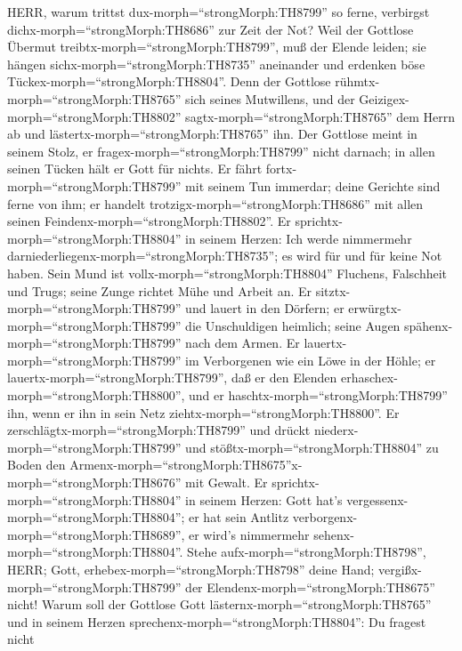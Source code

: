  HERR, warum trittst dux-morph=``strongMorph:TH8799'' so
ferne, verbirgst dichx-morph=``strongMorph:TH8686'' zur Zeit der Not?
 Weil der Gottlose Übermut
treibtx-morph=``strongMorph:TH8799'', muß der Elende leiden; sie hängen
sichx-morph=``strongMorph:TH8735'' aneinander und erdenken böse
Tückex-morph=``strongMorph:TH8804''.  Denn der Gottlose
rühmtx-morph=``strongMorph:TH8765'' sich seines Mutwillens, und der
Geizigex-morph=``strongMorph:TH8802'' sagtx-morph=``strongMorph:TH8765''
dem Herrn ab und lästertx-morph=``strongMorph:TH8765'' ihn. 
Der Gottlose meint in seinem Stolz, er
fragex-morph=``strongMorph:TH8799'' nicht darnach; in allen seinen
Tücken hält er Gott für nichts.  Er fährt
fortx-morph=``strongMorph:TH8799'' mit seinem Tun immerdar; deine
Gerichte sind ferne von ihm; er handelt
trotzigx-morph=``strongMorph:TH8686'' mit allen seinen
Feindenx-morph=``strongMorph:TH8802''.  Er
sprichtx-morph=``strongMorph:TH8804'' in seinem Herzen: Ich werde
nimmermehr darniederliegenx-morph=``strongMorph:TH8735''; es wird für
und für keine Not haben.  Sein Mund ist
vollx-morph=``strongMorph:TH8804'' Fluchens, Falschheit und Trugs; seine
Zunge richtet Mühe und Arbeit an.  Er
sitztx-morph=``strongMorph:TH8799'' und lauert in den Dörfern; er
erwürgtx-morph=``strongMorph:TH8799'' die Unschuldigen heimlich; seine
Augen spähenx-morph=``strongMorph:TH8799'' nach dem Armen. 
Er lauertx-morph=``strongMorph:TH8799'' im Verborgenen wie ein Löwe in
der Höhle; er lauertx-morph=``strongMorph:TH8799'', daß er den Elenden
erhaschex-morph=``strongMorph:TH8800'', und er
haschtx-morph=``strongMorph:TH8799'' ihn, wenn er ihn in sein Netz
ziehtx-morph=``strongMorph:TH8800''.  Er
zerschlägtx-morph=``strongMorph:TH8799'' und drückt
niederx-morph=``strongMorph:TH8799'' und
stößtx-morph=``strongMorph:TH8804'' zu Boden den
Armenx-morph=``strongMorph:TH8675''x-morph=``strongMorph:TH8676'' mit
Gewalt.  Er sprichtx-morph=``strongMorph:TH8804'' in seinem
Herzen: Gott hat's vergessenx-morph=``strongMorph:TH8804''; er hat sein
Antlitz verborgenx-morph=``strongMorph:TH8689'', er wird's nimmermehr
sehenx-morph=``strongMorph:TH8804''.  Stehe
aufx-morph=``strongMorph:TH8798'', HERR; Gott,
erhebex-morph=``strongMorph:TH8798'' deine Hand;
vergißx-morph=``strongMorph:TH8799'' der
Elendenx-morph=``strongMorph:TH8675'' nicht!  Warum soll
der Gottlose Gott lästernx-morph=``strongMorph:TH8765'' und in seinem
Herzen sprechenx-morph=``strongMorph:TH8804'': Du fragest nicht
